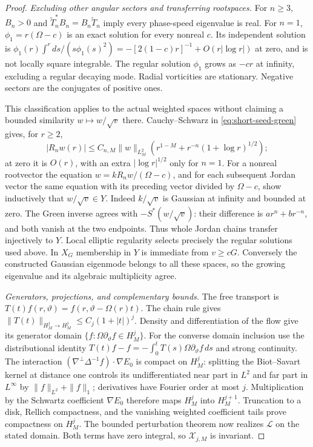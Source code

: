 \begin{proof}
\emph{Excluding other angular sectors and transferring rootspaces.}
For $n\ge3$, $B_n>0$ and
$\widetilde T_n^*B_n=B_n\widetilde T_n$ imply every phase-speed
eigenvalue is real. For $n=1$, $\phi_1=r(\Omega-c)$ is an exact
solution for every nonreal $c$. Its independent solution is
$\phi_1(r)\int^r ds/(s\phi_1(s)^2)
=-[2(1-c)r]^{-1}+O(r|\log r|)$ at zero, and is not locally
square integrable. The regular solution $\phi_1$ grows as $-cr$
at infinity, excluding a regular decaying mode. Radial vorticities
are stationary. Negative sectors are the conjugates of positive ones.

This classification applies to the actual weighted spaces without
claiming a bounded similarity $w\mapsto w/\sqrt v$ there.
Cauchy--Schwarz in \eqref{eq:short-seed-green} gives, for $r\ge2$,
\[
 |R_nw(r)|\le C_{n,M}\|w\|_{L^2_M}
       \left(r^{1-M}+r^{-n}(1+\log r)^{1/2}\right);
\]
at zero it is $O(r)$, with an extra $|\log r|^{1/2}$ only for $n=1$.
For a nonreal rootvector the equation
$w=kR_nw/(\Omega-c)$, and for each subsequent Jordan vector the
same equation with its preceding vector divided by $\Omega-c$,
show inductively that $w/\sqrt v\in Y$.
Indeed $k/\sqrt v$ is Gaussian at infinity and bounded at zero.
The Green inverse agrees with $-S^*(w/\sqrt v)$: their difference
is $ar^n+br^{-n}$, and both vanish at the two endpoints.
Thus whole Jordan chains transfer injectively to $Y$.
Local elliptic regularity selects precisely the regular solutions
used above. In $X_G$ membership in $Y$ is immediate from $v\ge cG$.
Conversely the constructed Gaussian eigenmode belongs to all these
spaces, so the growing eigenvalue and its algebraic multiplicity agree.

\emph{Generators, projections, and complementary bounds.}
The free transport is
$T(t)f(r,\vartheta)=f(r,\vartheta-\Omega(r)t)$.
The chain rule gives $\|T(t)\|_{H^j_M\to H^j_M}\le C_j(1+|t|)^j$.
Density and differentiation of the flow give its generator domain
$\{f:\Omega\partial_\vartheta f\in H^j_M\}$.
For the converse domain inclusion use the distributional identity
$T(t)f-f=-\int_0^tT(s)\Omega\partial_\vartheta f\,ds$ and strong continuity.
The interaction $(\nabla^\perp\Delta^{-1}f)\cdot\nabla E_0$ is
compact on $H^j_M$: splitting the Biot--Savart kernel at distance
one controls its undifferentiated near part in $L^2$ and far part
in $L^\infty$ by $\|f\|_{L^2}+\|f\|_1$; derivatives have Fourier
order at most $j$. Multiplication by the Schwartz coefficient
$\nabla E_0$ therefore maps $H^j_M$ into $H^{j+1}_M$.
Truncation to a disk, Rellich compactness, and the vanishing weighted
coefficient tails prove compactness on $H^j_M$.
The bounded perturbation theorem now realizes $\mathscr L$ on the
stated domain. Both terms have zero integral, so $\mathcal X_{j,M}$
is invariant.


\end{proof}
